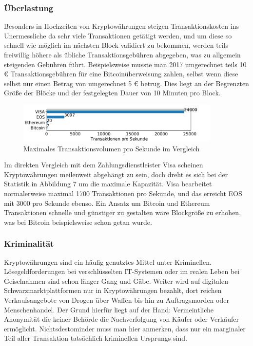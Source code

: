 \documentclass[12pt,oneside]{article}
\begin{document}
\subsubsection{Überlastung}

Besonders in Hochzeiten von Kryptowährungen steigen Transaktionskosten ins Unermessliche da sehr viele Transaktionen getätigt werden, und um diese so schnell wie möglich im nächsten Block validiert zu bekommen, werden teils freiwillig höhere als übliche Transaktionsgebühren abgegeben, was zu allgemein steigenden Gebühren führt. Beispielsweise musste man 2017 umgerechnet teils 10 € Transaktionsgebühren für eine Bitcoinüberweisung zahlen, selbst wenn diese selbst nur einen Betrag von umgerechnet 5 € betrug. Dies liegt an der Begrenzten Größe der Blöcke und der festgelegten Dauer von 10 Minuten pro Block. 


\begin{figure}[h]
\centering
\includegraphics[width=0.9\textwidth]{./images/transactions.pdf}
\caption{Maximales Transaktionsvolumen pro Sekunde im Vergleich \cite{rosenberg2019}}
\centering
\end{figure}

Im direkten Vergleich mit dem Zahlungsdienstleister Visa scheinen Kryptowährungen meilenweit abgehängt zu sein, doch dreht es sich bei der Statistik in Abbildung 7 um die maximale Kapazität. Visa bearbeitet normalerweise maximal 1700 Transaktionen pro Sekunde, und das erreicht EOS mit 3000 pro Sekunde ebenso. Ein Ansatz um Bitcoin und Ethereum Transaktionen schnelle und günstiger zu gestalten wäre Blockgröße zu erhöhen, was bei Bitcoin beispielsweise schon getan wurde.\cite{rosenberg2019}

\subsubsection{Kriminalität}

Kryptowährungen sind ein häufig genutztes Mittel unter Kriminellen. Lösegeldforderungen bei verschlüsselten IT-Systemen oder im realen Leben bei Geiselnahmen sind schon länger Gang und Gäbe. Weiter wird auf digitalen Schwarzmarktplattformen nur in Kryptowährungen bezahlt, dort reichen Verkaufsangebote von Drogen über Waffen bis hin zu Auftragsmorden oder Menschenhandel. Der Grund hierfür liegt auf der Hand: Vermeintliche Anonymität die keiner Behörde die Nachverfolgung von Käufer oder Verkäufer ermöglicht. Nichtsdestominder muss man hier anmerken, dass nur ein marginaler Teil aller Transaktion tatsächlich kriminellen Ursprungs sind.
\end{document}
